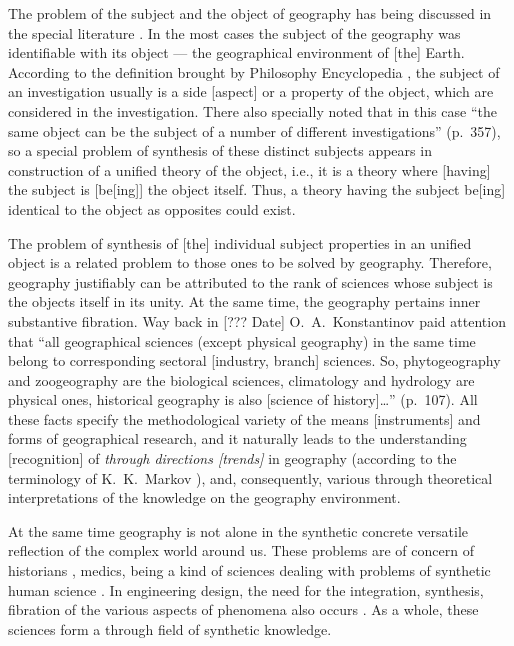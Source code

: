\documentclass[12pt,leqno]{book}
\numberwithin{equation}{chapter}
\begin{document}
The problem of the subject and the object of geography has being discussed in the special literature \cite{b98, b277, b300}. In the most cases the subject of the geography was identifiable with its object --- the geographical environment of [the] Earth. According to the definition brought by Philosophy Encyclopedia \cite{b441}, the subject of an investigation usually is a side [aspect] or a property of the object, which are considered in the investigation. There also specially noted that in this case ``the same object can be the subject of a number of different investigations'' (p.~357), so a special problem of synthesis of these distinct subjects appears in construction of a unified theory of the object, i.e., it is a theory where [having] the subject is [be[ing]] the object itself. Thus, a theory having the subject be[ing] identical to the object as opposites could exist.

The problem of synthesis of [the] individual subject properties in an unified object is a related problem to those ones to be solved by geography. Therefore, geography justifiably can be attributed to the rank of sciences whose subject is the objects itself in its unity. At the same time, the geography pertains inner substantive fibration. Way back in [??? Date] O.~A.~Konstantinov \cite{b207} paid attention that ``all geographical sciences (except physical geography) in the same time belong to corresponding sectoral [industry, branch] sciences. So, phytogeography and zoogeography are the biological sciences, climatology and hydrology are physical ones, historical geography is also [science of history]\ldots{}'' (p.~107). All these facts specify the methodological variety of the means [instruments] and forms of geographical research, and it naturally leads to the understanding [recognition] of \emph{through directions [trends]} in geography (according to the terminology of K.~K.~Markov \cite[p.~47]{b71}), and, consequently, various through theoretical interpretations of the knowledge on the geography environment.

At the same time geography is not alone in the synthetic concrete versatile reflection of the complex world around us. These problems are of concern of historians \cite{b30,b162}, medics\cite{b464}, being a kind of sciences dealing with problems of synthetic human science \cite{b14, b271}. In engineering design, the need for the integration, synthesis, fibration of the various aspects of phenomena also occurs \cite{b326}. As a whole, these sciences form a through field of synthetic knowledge.
\end{document}
